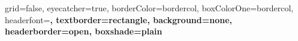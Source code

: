 \documentclass[a0paper,portrait,fontscale=0.27]{baposter}
\begin{document}


\begin{poster}{
	grid=false,
	eyecatcher=true, 
	borderColor=bordercol,
	boxColorOne=bordercol,
	headerfont=\Large\bf, 
	textborder=rectangle,
	background=none,
	headerborder=open,
    boxshade=plain
}
{

}
\end{poster}
\end{document}
